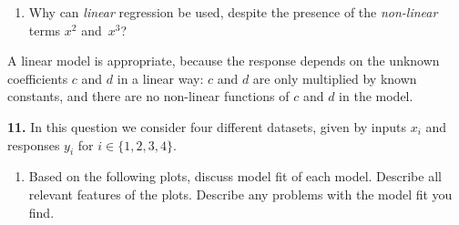 \documentclass[
  a4paper,
]{article}
\providecommand{\tightlist}{%
  \setlength{\itemsep}{0pt}\setlength{\parskip}{0pt}}
\theoremstyle{definition}
\theoremstyle{definition}
\theoremstyle{definition}
\theoremstyle{definition}
\theoremstyle{remark}
\begin{document}
\begin{enumerate}
\def\labelenumi{\alph{enumi}.}
\setcounter{enumi}{2}
\tightlist
\item
  Why can \emph{linear} regression be used, despite the presence
  of the \emph{non-linear} terms \(x^2\) and~\(x^3\)?
\end{enumerate}

\begin{myanswers}
A linear model is appropriate, because the response depends
on the unknown coefficients \(c\) and \(d\) in a linear way: \(c\) and \(d\)
are only multiplied by known constants, and there are no non-linear
functions of \(c\) and \(d\) in the model.

\end{myanswers}

\textbf{11.} In this question we consider four different datasets, given by
inputs \(x_i\) and responses \(y_i\) for \(i \in \{1, 2, 3, 4\}\).

\begin{enumerate}
\def\labelenumi{\alph{enumi}.}
\tightlist
\item
  Based on the following plots, discuss model fit of each model.
  Describe all relevant features of the plots.
  Describe any problems with the model fit you find.
\end{enumerate}
\end{document}
